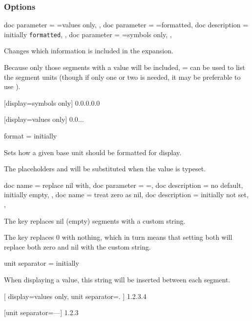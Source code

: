 \documentclass{article}
\begin{document}
\clearpage
\subsubsection{Options}
	
\begin{docKeys}[
		doc name = display,
	]{
		{
			doc parameter = {=values only},
		},
		{
			doc parameter = {=formatted},
			doc description = initially \texttt{formatted},
		},
		{
			doc parameter = {=symbols only},
		},
	}

Changes which information is included in the expansion.

Because only those segments with a value will be included, = can be used to list the segment units (though if only one or two is needed, it may be preferable to use ).

\begin{dispExample}
	[display=symbols only]
	{0.0.0.0.0}

	[display=values only]
	{0.0...}
\end{dispExample}
\end{docKeys}

\begin{docKey}
	{format}
	{=}
	{initially }

	Sets how a given base unit should be formatted for display.
	
	The placeholders  and  will be substituted when the value is typeset.
\end{docKey}

\begin{docKeys}
	[]
	{
		{
			doc name = replace nil with,
			doc parameter = {=},
			doc description = {no default, initially empty},
		},
		{
			doc name = treat zero as nil,
			doc description = {initially not set},
		},
	}

The key  replaces nil (empty) segments with a custom string.

The key  replaces 0 with nothing, which in turn means that setting both will replace both zero and nil with the custom string.

\end{docKeys}

\begin{docKey}
	{unit separator}
	{=}
	{initially }
	
	When displaying a value, this string will be inserted between each segment.

\begin{dispExample}
[
		display=values only,
		unit separator=.
	]
	{1.2.3.4}

	[unit separator={---}]
	{1.2.3}
\end{dispExample}

\end{docKey}
\end{document}
